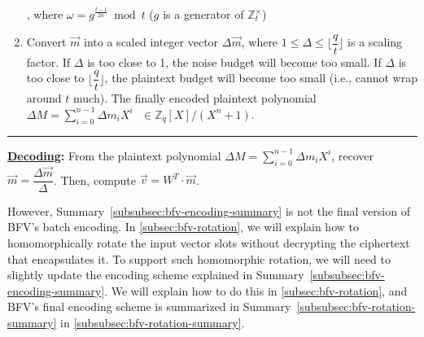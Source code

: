 \begin{tcolorbox}[title={\textbf{\tboxlabel{\ref*{subsubsec:bfv-encoding-summary}} BFV's Encoding and Decoding}}]
\begin{enumerate}
, where $\omega = g^{\frac{t - 1}{2n}} \bmod t$ ($g$ is a generator of $\mathbb{Z}_t^{\times}$)


\item Convert $\vec{m}$ into a scaled integer vector $\Delta\vec{m}$, where $1 \leq \Delta \leq \lfloor \dfrac{q}{t}\rfloor$ is a scaling factor. If $\Delta$ is too close to 1, the noise budget will become too small. If $\Delta$ is too close to $\lfloor\dfrac{q}{t}\rfloor$, the plaintext budget will become too small (i.e., cannot wrap around $t$ much). The finally encoded plaintext polynomial $\Delta M = \sum\limits_{i=0}^{n-1}  \Delta m_i X^i \text{ } \in \mathbb{Z}_q[X] / (X^n + 1)$. %

\end{enumerate}

\par\noindent\rule{\textwidth}{0.4pt}

\textbf{\underline{Decoding}:} From the plaintext polynomial $\Delta M = \sum\limits_{i=0}^{n-1}\Delta m_iX^i$, recover $\vec{m} = \dfrac{\Delta \vec{m}}{\Delta}$. Then,
compute $\vec{v} = W^T \cdot \vec{m}$.

\end{tcolorbox}



However, Summary~\ref*{subsubsec:bfv-encoding-summary} is not the final version of BFV's batch encoding. In \autoref{subsec:bfv-rotation}, we will explain how to homomorphically rotate the input vector slots without decrypting the ciphertext that encapsulates it. To support such homomorphic rotation, we will need to slightly update the encoding scheme explained in Summary~\ref*{subsubsec:bfv-encoding-summary}. We will explain how to do this in \autoref{subsec:bfv-rotation}, and BFV's final encoding scheme is summarized in Summary~\ref*{subsubsec:bfv-rotation-summary} in \autoref{subsubsec:bfv-rotation-summary}.


